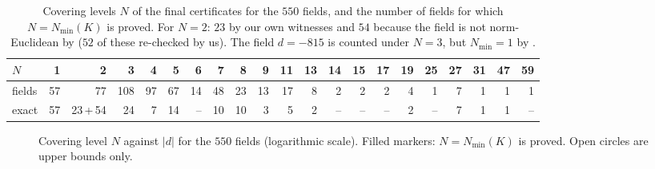 \documentclass[11pt]{amsart}
\theoremstyle{definition}
\theoremstyle{remark}
\numberwithin{equation}{section}
\newcommand{\Nmin}{N_{\min}}
\begin{document}
\begin{table}[ht]
\centering\small
\setlength{\tabcolsep}{3.6pt}
\begin{tabular}{l*{20}{r}}
\toprule
$N$ & 1 & 2 & 3 & 4 & 5 & 6 & 7 & 8 & 9 & 11 & 13 & 14 & 15 & 17 & 19 & 25 & 27 & 31 & 47 & 59\\
\midrule
fields & 57 & 77 & 108 & 97 & 67 & 14 & 48 & 23 & 13 & 17 & 8 & 2 & 2 & 2 & 4 & 1 & 7 & 1 & 1 & 1\\
exact & 57 & 23\,+\,54 & 24 & 7 & 14 & -- & 10 & 10 & 3 & 5 & 2 & -- & -- & -- & 2 & -- & 7 & 1 & 1 & --\\
\bottomrule
\end{tabular}
\caption{Covering levels $N$ of the final certificates for the $550$ fields, and the number of
fields for which $N=\Nmin(K)$ is proved. For $N=2$: $23$ by our own witnesses and $54$ because
the field is not norm-Euclidean by \cite{BBT} ($52$ of these re-checked by us). The field
$d=-815$ is counted under $N=3$, but $\Nmin=1$ by \cite{CL,BBT}.}
\label{tab:N}
\end{table}

\begin{figure}[t]
\centering
{}
\caption{Covering level $N$ against $|d|$ for the $550$ fields (logarithmic scale). Filled
markers: $N=\Nmin(K)$ is proved. Open circles are upper bounds only.}
\label{fig:nmin}
\end{figure}
\end{document}
